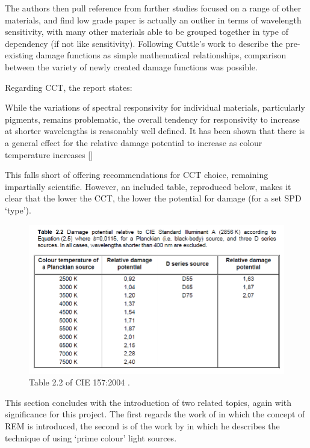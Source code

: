 The authors then pull reference from further studies focused on a range of other materials, and find low grade paper is actually an outlier in terms of wavelength sensitivity, with many other materials able to be grouped together in type of dependency (if not like sensitivity). Following Cuttle's work \citep{cuttle_lighting_1988} to describe the pre-existing damage functions as simple mathematical relationships, comparison between the variety of newly created damage functions was possible.

Regarding \gls{CCT}, the report states:

\begin{itquote}{}
While the variations of spectral responsivity for individual materials, particularly pigments, remains problematic, the overall tendency for responsivity to increase at shorter wavelengths is reasonably well defined. It has been shown that there is a general effect for the relative damage potential to increase as colour temperature increases [\citet{cuttle_lighting_1988}]
\end{itquote}

This falls short of offering recommendations for \gls{CCT} choice, remaining impartially scientific. However, an included table, reproduced below, makes it clear that the lower the \gls{CCT}, the lower the potential for damage (for a set SPD `type').

\begin{figure}[htbp]
\includegraphics[max width=\textwidth]{figs/LitRev/CIE2004b.png}
\caption{Table 2.2 of \gls{CIE} 157:2004 \citep{cie_cie_2004}.}
\label{fig:CIE2004b}
\end{figure}

This section concludes with the introduction of two related topics, again with significance for this project. The first regards the work of \citet{miller_evaluating_1993} in which the concept of \gls{REM} is introduced, the second is of the work by \citet{thornton_high_1975} in which he describes the technique of using `prime colour' light sources.

